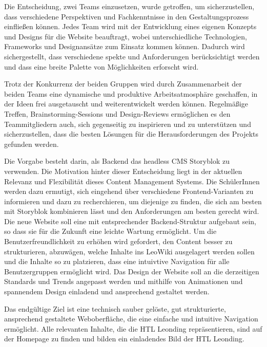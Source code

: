 Die Entscheidung, zwei Teams einzusetzen, wurde getroffen, um sicherzustellen, dass verschiedene Perspektiven und Fachkenntnisse in 
den Gestaltungsprozess einfließen können. Jedes Team wird mit der Entwicklung eines eigenen Konzepts und Designs für die Website beauftragt, 
wobei unterschiedliche Technologien, Frameworks und Designansätze zum Einsatz kommen können. Dadurch wird sichergestellt, dass verschiedene 
spekte und Anforderungen berücksichtigt werden und dass eine breite Palette von Möglichkeiten erforscht wird.

Trotz der Konkurrenz der beiden Gruppen wird durch Zusammenarbeit der beiden Teams  eine dynamische und produktive Arbeitsatmosphäre geschaffen, in der Ideen frei 
ausgetauscht und weiterentwickelt werden können. Regelmäßige Treffen, Brainstorming-Sessions und Design-Reviews ermöglichen es den 
Teammitgliedern auch, sich gegenseitig zu inspirieren und zu unterstützen und sicherzustellen, dass die besten Lösungen für die Herausforderungen 
des Projekts gefunden werden.


Die Vorgabe besteht darin, als Backend das headless CMS Storyblok zu verwenden. Die Motivation hinter dieser Entscheidung 
liegt in der aktuellen Relevanz und Flexibilität dieses Content Management Systems. Die SchülerInnen werden dazu ermutigt, 
sich eingehend über verschiedene Frontend-Varianten zu informieren und dazu zu recherchieren, um diejenige zu finden, 
die sich am besten mit Storyblok kombinieren lässt und den Anforderungen am besten gerecht wird.
Die neue Website soll eine mit entsprechender Backend-Struktur aufgebaut sein, so dass
sie für die Zukunft eine leichte Wartung ermöglicht. 
Um die Benutzerfreundlichkeit zu erhöhen wird gefordert, den Content besser zu strukturieren,
abzuwägen, welche Inhalte ins LeoWiki ausgelagert werden sollen und die Inhalte so zu 
platzieren, dass eine intuivtive Navigation für alle Benutzergruppen ermöglicht wird.
Das Design der Website soll an die derzeitigen Standards und Trends angepasst werden
und mithilfe von Animationen und spannendem Design einladend und ansprechend gestaltet werden.

Das endgültige Ziel ist eine technisch sauber gelöste, gut strukturierte, ansprechend gestaltete
Weboberfläche, die eine einfache und intuitive Navigation ermöglicht. Alle relevanten Inhalte, die die HTL Leonding repräsentieren,
sind auf der Homepage zu finden und bilden ein einladendes Bild der HTL Leonding. 
